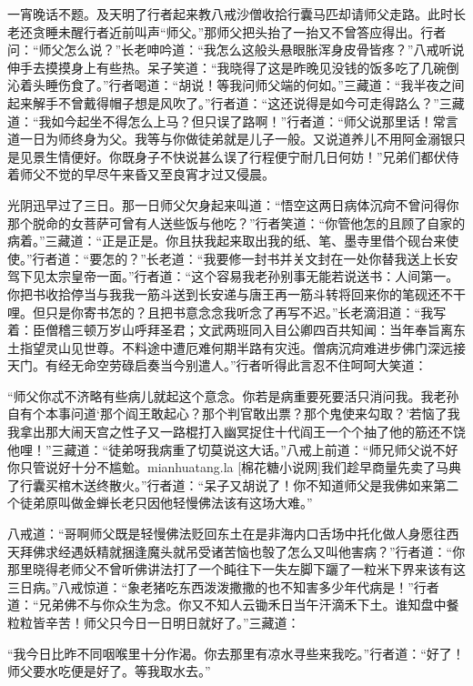 \documentclass[12pt,UTF8]{ctexbook}
\begin{document}
{	一宵晚话不题。及天明了行者起来教八戒沙僧收拾行囊马匹却请师父走路。此时长老还贪睡未醒行者近前叫声“师父。”那师父把头抬了一抬又不曾答应得出。行者问：“师父怎么说？”长老呻吟道：“我怎么这般头悬眼胀浑身皮骨皆疼？”八戒听说伸手去摸摸身上有些热。呆子笑道：“我晓得了这是昨晚见没钱的饭多吃了几碗倒沁着头睡伤食了。”行者喝道：“胡说！等我问师父端的何如。”三藏道：“我半夜之间起来解手不曾戴得帽子想是风吹了。”行者道：“这还说得是如今可走得路么？”三藏道：“我如今起坐不得怎么上马？但只误了路啊！”行者道：“师父说那里话！常言道一日为师终身为父。我等与你做徒弟就是儿子一般。又说道养儿不用阿金溺银只是见景生情便好。你既身子不快说甚么误了行程便宁耐几日何妨！”兄弟们都伏侍着师父不觉的早尽午来昏又至良宵才过又侵晨。
	
	光阴迅早过了三日。那一日师父欠身起来叫道：“悟空这两日病体沉疴不曾问得你那个脱命的女菩萨可曾有人送些饭与他吃？”行者笑道：“你管他怎的且顾了自家的病着。”三藏道：“正是正是。你且扶我起来取出我的纸、笔、墨寺里借个砚台来使使。”行者道：“要怎的？”长老道：“我要修一封书并关文封在一处你替我送上长安驾下见太宗皇帝一面。”行者道：“这个容易我老孙别事无能若说送书：人间第一。你把书收拾停当与我我一筋斗送到长安递与唐王再一筋斗转将回来你的笔砚还不干哩。但只是你寄书怎的？且把书意念念我听念了再写不迟。”长老滴泪道：“我写着：臣僧稽三顿万岁山呼拜圣君；文武两班同入目公卿四百共知闻：当年奉旨离东土指望灵山见世尊。不料途中遭厄难何期半路有灾迍。僧病沉疴难进步佛门深远接天门。有经无命空劳碌启奏当今别遣人。”行者听得此言忍不住呵呵大笑道：
	
	“师父你忒不济略有些病儿就起这个意念。你若是病重要死要活只消问我。我老孙自有个本事问道‘那个阎王敢起心？那个判官敢出票？那个鬼使来勾取？’若恼了我我拿出那大闹天宫之性子又一路棍打入幽冥捉住十代阎王一个个抽了他的筋还不饶他哩！”三藏道：“徒弟呀我病重了切莫说这大话。”八戒上前道：“师兄师父说不好你只管说好十分不尴魀。mianhuatang.la [棉花糖小说网]我们趁早商量先卖了马典了行囊买棺木送终散火。”行者道：“呆子又胡说了！你不知道师父是我佛如来第二个徒弟原叫做金蝉长老只因他轻慢佛法该有这场大难。”
	
	八戒道：“哥啊师父既是轻慢佛法贬回东土在是非海内口舌场中托化做人身愿往西天拜佛求经遇妖精就捆逢魔头就吊受诸苦恼也彀了怎么又叫他害病？”行者道：“你那里晓得老师父不曾听佛讲法打了一个盹往下一失左脚下躧了一粒米下界来该有这三日病。”八戒惊道：“象老猪吃东西泼泼撒撒的也不知害多少年代病是！”行者道：“兄弟佛不与你众生为念。你又不知人云锄禾日当午汗滴禾下土。谁知盘中餐粒粒皆辛苦！师父只今日一日明日就好了。”三藏道：
	
	“我今日比昨不同咽喉里十分作渴。你去那里有凉水寻些来我吃。”行者道：“好了！师父要水吃便是好了。等我取水去。”
	
}
\end{document}

